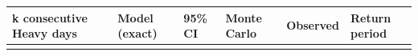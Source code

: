\documentclass[11pt,a4paper]{article}
\begin{document}
{\def\LTcaptype{none} %

\begin{longtable}[]{@{}

  >{\raggedright\arraybackslash}p{}

  >{\raggedright\arraybackslash}p{}

  >{\raggedright\arraybackslash}p{}

  >{\raggedright\arraybackslash}p{}

  >{\raggedright\arraybackslash}p{}

  >{\raggedright\arraybackslash}p{}@{}}

\toprule\noalign{}

\begin{minipage}[b]{\linewidth}\raggedright

k consecutive Heavy days

\end{minipage} & \begin{minipage}[b]{\linewidth}\raggedright

Model (exact)

\end{minipage} & \begin{minipage}[b]{\linewidth}\raggedright

95\% CI

\end{minipage} & \begin{minipage}[b]{\linewidth}\raggedright

Monte Carlo

\end{minipage} & \begin{minipage}[b]{\linewidth}\raggedright

Observed

\end{minipage} & \begin{minipage}[b]{\linewidth}\raggedright

Return period

\end{minipage} \\

\midrule\noalign{}

\endhead

\bottomrule\noalign{}


\end{longtable}}
\end{document}
